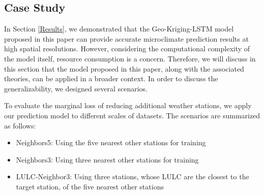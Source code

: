\documentclass[a4paper,fleqn]{cas-sc}
\begin{document}

\iffalse 
\subsection{Case Study}

In Section \ref{Results}, we demonstrated that the Geo-Kriging-LSTM model proposed in this paper can provide accurate microclimate prediction results at high spatial resolutions. However, considering the computational complexity of the model itself, resource consumption is a concern. Therefore, we will discuss in this section that the model proposed in this paper, along with the associated theories, can be applied in a broader context. In order to discuss the generalizability, we designed several scenarios.

To evaluate the marginal loss of reducing additional weather stations, we apply our prediction model to different scales of datasets. The scenarios are summarized as follows:
\begin{itemize}
    \item Neighbors5: Using the five nearest other stations for training
    \item Neighbors3: Using three nearest other stations for training
    \item LULC-Neighbor3: Using three stations, whose LULC are the closest to the target station, of the five nearest other stations
\end{itemize}
\end{document}
